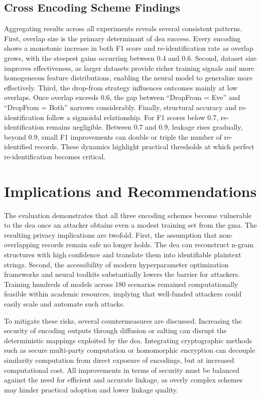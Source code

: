 \documentclass[a4paper,11pt]{scrartcl}
\begin{document}
\subsection{Cross Encoding Scheme Findings}
Aggregating results across all experiments reveals several consistent patterns. 
First, overlap size is the primary determinant of \ac{dea} success.
Every encoding shows a monotonic increase in both F1 score and re-identification rate as overlap grows, with the steepest gains occurring between 0.4 and 0.6. 
Second, dataset size improves effectiveness, as larger datasets provide richer training signals and more homogeneous feature distributions, enabling the neural model to generalize more effectively. 
Third, the drop-from strategy influences outcomes mainly at low overlaps.
Once overlap exceeds 0.6, the gap between ``DropFrom = Eve'' and ``DropFrom = Both'' narrows considerably. 
Finally, structural accuracy and re-identification follow a sigmoidal relationship.
For F1 scores below 0.7, re-identification remains negligible. 
Between 0.7 and 0.9, leakage rises gradually, beyond 0.9, small F1 improvements can double or triple the number of re-identified records. 
These dynamics highlight practical thresholds at which perfect re-identification becomes critical.

\section{Implications and Recommendations}
The evaluation demonstrates that all three encoding schemes become vulnerable to the \ac{dea} once an attacker obtains even a modest training set from the \ac{gma}. 
The resulting privacy implications are twofold. 
First, the assumption that non-overlapping records remain safe no longer holds.
The \ac{dea} can reconstruct n-gram structures with high confidence and translate them into identifiable plaintext strings. 
Second, the accessibility of modern hyperparameter optimization frameworks and neural toolkits substantially lowers the barrier for attackers. 
Training hundreds of models across 180 scenarios remained computationally feasible within academic resources, implying that well-funded attackers could easily scale and automate such attacks. 

To mitigate these risks, several countermeasures are discussed. 
Increasing the security of encoding outputs through diffusion or salting can disrupt the deterministic mappings exploited by the \ac{dea}. 
Integrating cryptographic methods such as secure multi-party computation or homomorphic encryption can decouple similarity computation from direct exposure of encodings, but at increased computational cost. 
All improvements in terms of security must be balanced against the need for efficient and accurate linkage, as overly complex schemes may hinder practical adoption and lower linkage quality. 
\end{document}
